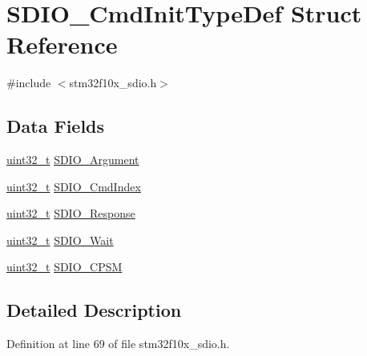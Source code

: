 \hypertarget{struct_s_d_i_o___cmd_init_type_def}{\section{S\-D\-I\-O\-\_\-\-Cmd\-Init\-Type\-Def Struct Reference}
\label{struct_s_d_i_o___cmd_init_type_def}
}


{\ttfamily \#include $<$stm32f10x\-\_\-sdio.\-h$>$}

\subsection*{Data Fields}
\begin{DoxyCompactItemize}
\item 
\hyperlink{stdint_8h_a435d1572bf3f880d55459d9805097f62}{uint32\-\_\-t} \hyperlink{struct_s_d_i_o___cmd_init_type_def_a37dfc4d7191ec10cffdb05ecf58d4807}{S\-D\-I\-O\-\_\-\-Argument}
\item 
\hyperlink{stdint_8h_a435d1572bf3f880d55459d9805097f62}{uint32\-\_\-t} \hyperlink{struct_s_d_i_o___cmd_init_type_def_ab5e1df1f0e8d48a308edfb59a6f80fb4}{S\-D\-I\-O\-\_\-\-Cmd\-Index}
\item 
\hyperlink{stdint_8h_a435d1572bf3f880d55459d9805097f62}{uint32\-\_\-t} \hyperlink{struct_s_d_i_o___cmd_init_type_def_aecb203e21321126d5f05c34787cacfd2}{S\-D\-I\-O\-\_\-\-Response}
\item 
\hyperlink{stdint_8h_a435d1572bf3f880d55459d9805097f62}{uint32\-\_\-t} \hyperlink{struct_s_d_i_o___cmd_init_type_def_a582258554233ff8550bd04d2d790c67c}{S\-D\-I\-O\-\_\-\-Wait}
\item 
\hyperlink{stdint_8h_a435d1572bf3f880d55459d9805097f62}{uint32\-\_\-t} \hyperlink{struct_s_d_i_o___cmd_init_type_def_ab0e869ae285cc132478dd743c28cd8e2}{S\-D\-I\-O\-\_\-\-C\-P\-S\-M}
\end{DoxyCompactItemize}


\subsection{Detailed Description}


Definition at line 69 of file stm32f10x\-\_\-sdio.\-h.



